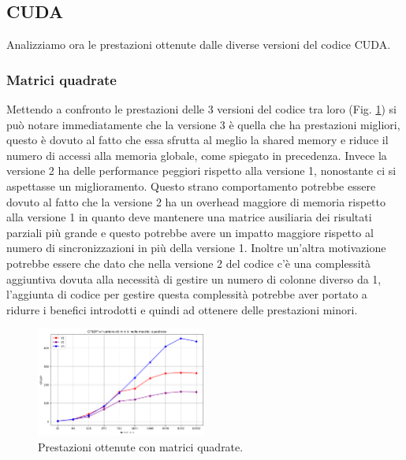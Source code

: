 \documentclass[conference]{IEEEtran}
\begin{document}
\subsection{CUDA}
Analizziamo ora le prestazioni ottenute dalle diverse versioni del codice CUDA.\\
\subsubsection{Matrici quadrate}
Mettendo a confronto le prestazioni delle 3 versioni del codice tra loro (Fig. \ref{fig:square_matrix}) si può notare immediatamente che la versione 3 è quella che ha prestazioni migliori, questo è dovuto al fatto che essa sfrutta al meglio la shared memory e riduce il numero di accessi alla memoria globale, come spiegato in precedenza. 
Invece la versione 2 ha delle performance peggiori rispetto alla versione 1, nonostante ci si aspettasse un miglioramento. 
Questo strano comportamento potrebbe essere dovuto al fatto che la versione 2 ha un overhead maggiore di memoria rispetto alla versione 1 in quanto deve mantenere una matrice ausiliaria dei risultati parziali più grande e questo potrebbe avere un impatto maggiore rispetto al numero di sincronizzazioni in più della versione 1. Inoltre un'altra motivazione potrebbe essere che dato che nella versione 2 del codice c'è una complessità aggiuntiva dovuta alla necessità di gestire un numero di colonne diverso da 1, l'aggiunta di codice per gestire questa complessità potrebbe aver portato a ridurre i benefici introdotti e quindi ad ottenere delle prestazioni minori.\\
\begin{figure}[H]
    \centering
    \includegraphics[width=0.5\textwidth]{resources/gpu_matrix_square.png}
    \caption{Prestazioni ottenute con matrici quadrate.}
    \label{fig:square_matrix}
\end{figure}
\end{document}
